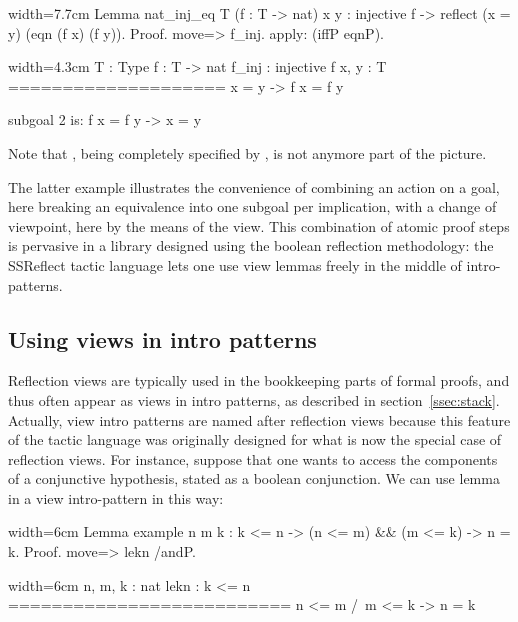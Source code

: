 \begin{coq-left}{}{width=7.7cm}
Lemma nat_inj_eq T (f : T -> nat) x y :
  injective f ->
    reflect (x = y) (eqn (f x) (f y)).
Proof.
move=> f_inj.
apply: (iffP eqnP).
$~$
$~$
$~$
\end{coq-left}
\begin{coqout-right}{}{width=4.3cm}
T : Type
f : T -> nat
f_inj : injective f
x, y : T
====================
x = y -> f x = f y

subgoal 2 is:
 f x = f y -> x = y
\end{coqout-right}

Note that , being completely specified by , is not
anymore part of the picture. 

The latter example illustrates the convenience of combining an action
on a goal, here breaking an equivalence into one subgoal per
implication, with a change of viewpoint, here by the means of the
 view. This combination of atomic proof steps is pervasive in
a library designed using the boolean reflection methodology: the
SSReflect tactic language lets one use view lemmas freely
in the middle of intro-patterns.

\subsection{Using views in intro patterns}

Reflection views are typically used in the bookkeeping parts of formal
proofs, and thus often appear as views in intro patterns, as described
in section~\ref{ssec:stack}. Actually, view intro patterns are named
after reflection views because this feature of the tactic language was
originally designed for what is now the special case of reflection
views. For instance, suppose
that one wants to access the components of a conjunctive hypothesis,
stated as a boolean conjunction. We can use lemma  in a view
intro-pattern in this way:

\begin{coq-left}{}{width=6cm}
Lemma example n m k : k <= n ->
  (n <= m) && (m <= k) -> n = k.
Proof.
move=> lekn /andP.
\end{coq-left}
\begin{coqout-right}{}{width=6cm}
n, m, k : nat
lekn : k <= n
==========================
 n <= m /\ m <= k -> n = k
\end{coqout-right}

